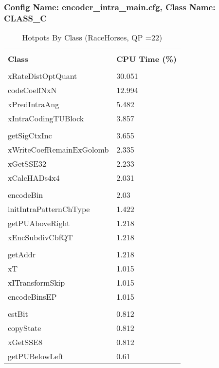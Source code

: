 \documentclass{article}%
\begin{document}
\subsubsection{Config Name: encoder\_intra\_main.cfg, Class Name: CLASS\_C}%
\label{ssubsec:ConfigNameencoderintramain.cfg,ClassNameCLASSC}%
\begin{longtabu}{| X[l] | X[l] |}%
\caption{%
Hotpots By Class (RaceHorses, QP =22)%
}%
\hline%
&\\%
\textbf{Class}&\textbf{CPU Time (\%)}\\%
&\\%
\hline%
\endhead%
xRateDistOptQuant&30.051\\%
\hline%
codeCoeffNxN&12.994\\%
\hline%
xPredIntraAng&5.482\\%
\hline%
xIntraCodingTUBlock&3.857\\%
\hline%
&\\%
\hline%
getSigCtxInc&3.655\\%
\hline%
xWriteCoefRemainExGolomb&2.335\\%
\hline%
xGetSSE32&2.233\\%
\hline%
xCalcHADs4x4&2.031\\%
\hline%
&\\%
\hline%
encodeBin&2.03\\%
\hline%
initIntraPatternChType&1.422\\%
\hline%
getPUAboveRight&1.218\\%
\hline%
xEncSubdivCbfQT&1.218\\%
\hline%
&\\%
\hline%
getAddr&1.218\\%
\hline%
xT&1.015\\%
\hline%
xITransformSkip&1.015\\%
\hline%
encodeBinsEP&1.015\\%
\hline%
&\\%
\hline%
estBit&0.812\\%
\hline%
copyState&0.812\\%
\hline%
xGetSSE8&0.812\\%
\hline%
getPUBelowLeft&0.61\\%
\hline%
\end{longtabu}%
\newpage%
\end{document}
